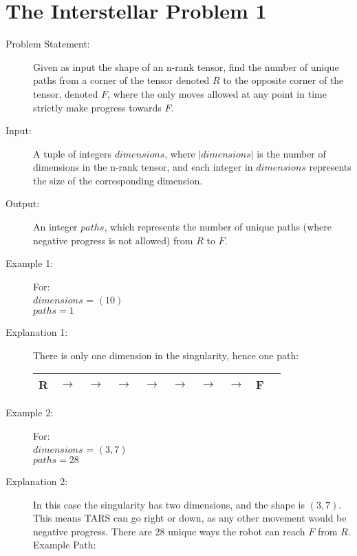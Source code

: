 \section{The Interstellar Problem 1}
\begin{description}
    \item[Problem Statement:]
    Given as input the shape of an n-rank tensor, find the number of unique paths from a corner of the tensor denoted $R$ to the opposite corner of the tensor,
    denoted $F$, where the only moves allowed at any point in time strictly make progress towards $F$.
        
    \item[Input:]
    A tuple of integers $dimensions$, where $|dimensions|$ is the number of dimensions in the n-rank tensor, and each integer in $dimensions$ represents the size of the corresponding dimension.
        
    \item[Output:] 
    An integer $paths$, which represents the number of unique paths (where negative progress is not allowed) from $R$ to $F$.
        
    \item[Example 1:] For:\\
    $dimensions$ = $(10)$\\
    $paths = 1$
    \item[Explanation 1:]
    There is only one dimension in the singularity, hence one path:
    \begin{table}[H]
        \centering
        \begin{tabular}{|c|c|c|c|c|c|c|c|c|c|}
            \hline
            \textbf{R} & $\rightarrow$ & $\rightarrow$ &$\rightarrow$ & $\rightarrow$ & $\rightarrow$& $\rightarrow$&$\rightarrow$ & \textbf{F} \\
            \hline
        \end{tabular}
    \end{table}

    \item[Example 2:] For:\\
    $dimensions$ = $(3,7)$\\
    $paths = 28$

    \item[Explanation 2:]
    In this case the singularity has two dimensions, and the shape is $(3,7)$. This means TARS can go right or down, as any other movement would be negative progress.
    There are 28 unique ways the robot can reach $F$ from $R$.
    Example Path:


\end{description}
